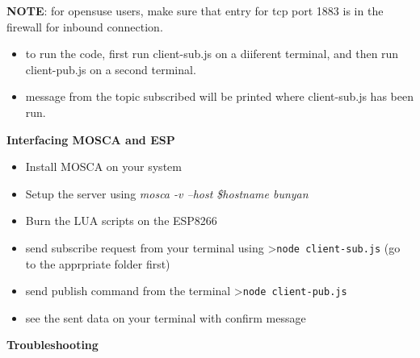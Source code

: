 \documentclass[16pt]{article}
\begin{document}
\vspace{0.3cm}

\textbf{NOTE}: for opensuse users, make sure that entry for tcp port
1883 is in the firewall for inbound connection.

\begin{itemize}

\item
  to run the code, first run client-sub.js on a diiferent terminal, and
  then run client-pub.js on a second terminal.
\item
  message from the topic subscribed will be printed where client-sub.js
  has been run.
\end{itemize}

\vspace{0.5cm}

{\LARGE{\textbf{Interfacing MOSCA and ESP}}}

\begin{itemize}

\item
  Install MOSCA on your system
\item
  Setup the server using \emph{mosca -v --host \$hostname \textbar{}
  bunyan}
\item
  Burn the LUA scripts on the ESP8266
\item
  send subscribe request from your terminal using
  \textgreater{}\texttt{node client-sub.js} (go to the apprpriate folder
  first)
\item
  send publish command from the terminal
  \textgreater{}\texttt{node client-pub.js}
\item
  see the sent data on your terminal with confirm message
\end{itemize}



{\Large{\textbf{Troubleshooting}}}
\end{document}

